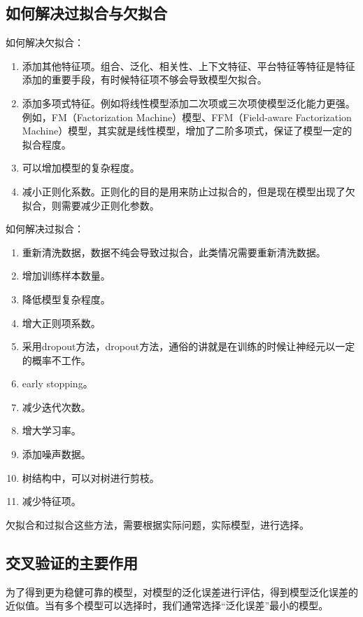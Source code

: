 \subsection{如何解决过拟合与欠拟合}

如何解决欠拟合：

\begin{enumerate}
	\itemsep0em 
	\item 添加其他特征项。组合、泛化、相关性、上下文特征、平台特征等特征是特征添加的重要手段，有时候特征项不够会导致模型欠拟合。
	\item 添加多项式特征。例如将线性模型添加二次项或三次项使模型泛化能力更强。例如，FM（Factorization Machine）模型、FFM（Field-aware Factorization Machine）模型，其实就是线性模型，增加了二阶多项式，保证了模型一定的拟合程度。
	\item 可以增加模型的复杂程度。
	\item 减小正则化系数。正则化的目的是用来防止过拟合的，但是现在模型出现了欠拟合，则需要减少正则化参数。
\end{enumerate}

如何解决过拟合：

\begin{enumerate}
	\itemsep0em 
	\item 重新清洗数据，数据不纯会导致过拟合，此类情况需要重新清洗数据。 
	\item 增加训练样本数量。 
	\item 降低模型复杂程度。 
	\item 增大正则项系数。 
	\item 采用dropout方法，dropout方法，通俗的讲就是在训练的时候让神经元以一定的概率不工作。 
	\item early stopping。 
	\item 减少迭代次数。 
	\item 增大学习率。 
	\item 添加噪声数据。 
	\item 树结构中，可以对树进行剪枝。 
	\item 减少特征项。
\end{enumerate}

欠拟合和过拟合这些方法，需要根据实际问题，实际模型，进行选择。

\subsection{交叉验证的主要作用}

为了得到更为稳健可靠的模型，对模型的泛化误差进行评估，得到模型泛化误差的近似值。当有多个模型可以选择时，我们通常选择“泛化误差”最小的模型。 

